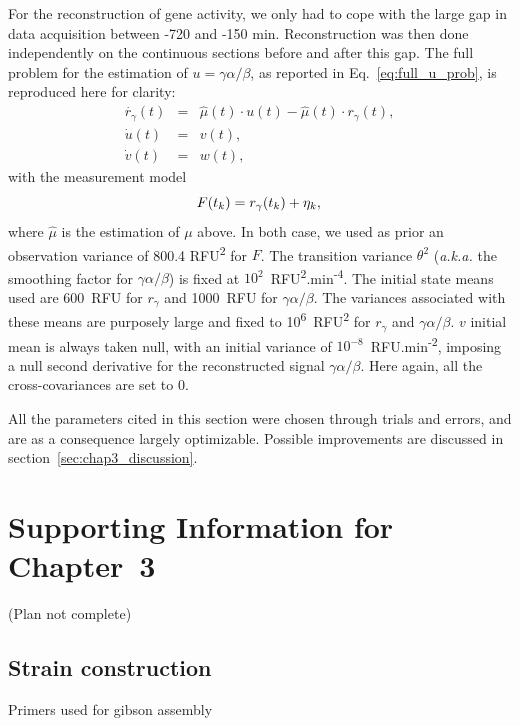 For the reconstruction of gene activity, we only had to cope with the large gap in data acquisition between -720 and -150 min.
Reconstruction was then done independently on the continuous sections before and after this gap.
The full problem for the estimation of $u = \gamma \alpha / \beta$, as reported in Eq.~\ref{eq:full_u_prob}, is reproduced here for clarity:
\begin{eqnarray*}
\dot{r_\gamma}(t) &=& \hat{\mu} (t) \cdot u (t) - \hat{\mu} (t) \cdot r_\gamma (t), \nonumber\\
\dot{u}(t) &=& v(t),\\
\dot{v}(t) &=& w(t),\nonumber
\end{eqnarray*}
with the measurement model
\begin{equation*}
F(t_k) = r_\gamma (t_k) + \eta_k,\\
\end{equation*}
where $\hat{\mu}$ is the estimation of $\mu$ above.
In both case, we used as prior an observation variance of 800.4 RFU\textsuperscript{2} for $F$.
The transition variance $\theta^2$ (\textit{a.k.a.} the smoothing factor for $\gamma \alpha / \beta$) is fixed at $10^2$~RFU\textsuperscript{2}.min\textsuperscript{-4}.
The initial state means used are 600~RFU for $r_\gamma$ and 1000~RFU for $\gamma \alpha / \beta$.
The variances associated with these means are purposely large and fixed to 10\textsuperscript{6}~RFU\textsuperscript{2} for $r_\gamma$ and $\gamma \alpha / \beta$.
$v$ initial mean is always taken null, with an initial variance of $10^{-8}$~RFU.min\textsuperscript{-2}, imposing a null second derivative for the reconstructed signal $\gamma \alpha / \beta$.
Here again, all the cross-covariances are set to 0.

All the parameters cited in this section were chosen through trials and errors, and are as a consequence largely optimizable.
Possible improvements are discussed in section~\ref{sec:chap3_discussion}.

\section{Supporting Information for Chapter~3}

(Plan not complete)

\subsection{Strain construction}

Primers used for gibson assembly

